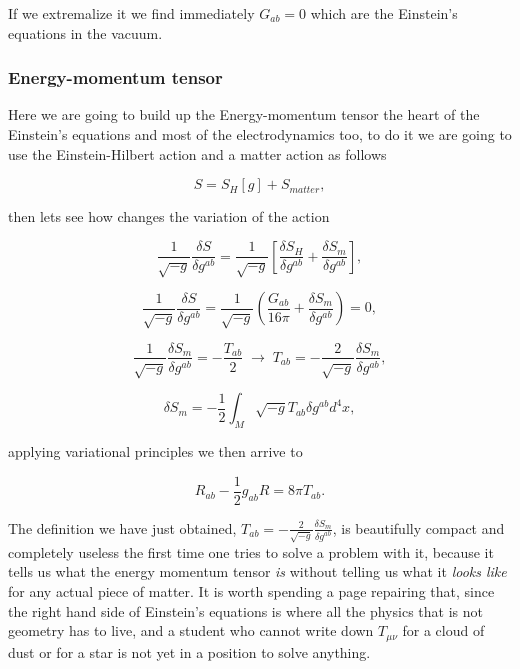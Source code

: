         If we extremalize it we find immediately $G_{ab}=0$ which are the Einstein's equations in the vacuum. 
        
            \subsubsection{Energy-momentum tensor}

        Here we are going to build up the Energy-momentum tensor the heart of the Einstein's equations and most of the electrodynamics too, to do it we are going to use the Einstein-Hilbert action and a matter action as follows

        \begin{equation}
            S = S_H[g] + S_{matter},
        \end{equation}

        then lets see how changes the variation of the action

        \begin{equation}
            \frac{1}{\sqrt{-g}}\frac{\delta S}{\delta g^{ab}} = \frac{1}{\sqrt{-g}}\left[\frac{\delta S_{H}}{\delta g^{ab}} + \frac{\delta S_m}{\delta g^{ab}} \right],
        \end{equation}

        \begin{equation}
            \frac{1}{\sqrt{-g}}\frac{\delta S}{\delta g^{ab}} = \frac{1}{\sqrt{-g}}\left(\frac{G_{ab}}{16\pi} + \frac{\delta S_m}{\delta g^{ab}} \right)=0,
        \end{equation}

        \begin{equation}
            \frac{1}{\sqrt{-g}}\frac{\delta S_m}{\delta g^{ab}} = -\frac{T_{ab}}{2}\;\rightarrow\; T_{ab}=-\frac{2}{\sqrt{-g}}\frac{\delta S_m}{\delta g^{ab}},
        \end{equation}

        \begin{equation}
            \delta S_m = -\frac{1}{2}\int_M\sqrt{-g}T_{ab}\delta g^{ab}d^4x,
        \end{equation}

        applying variational principles we then arrive to 

        \begin{equation}
            R_{ab}-\frac{1}{2}g_{ab}R = 8\pi T_{ab}.
        \end{equation}

        The definition we have just obtained, $T_{ab} = -\frac{2}{\sqrt{-g}}\frac{\delta S_m}{\delta g^{ab}}$, is beautifully compact and completely useless the first time one tries to solve a problem with it, because it tells us what the energy momentum tensor \textit{is} without telling us what it \textit{looks like} for any actual piece of matter. It is worth spending a page repairing that, since the right hand side of Einstein's equations is where all the physics that is not geometry has to live, and a student who cannot write down $T_{\mu\nu}$ for a cloud of dust or for a star is not yet in a position to solve anything.

